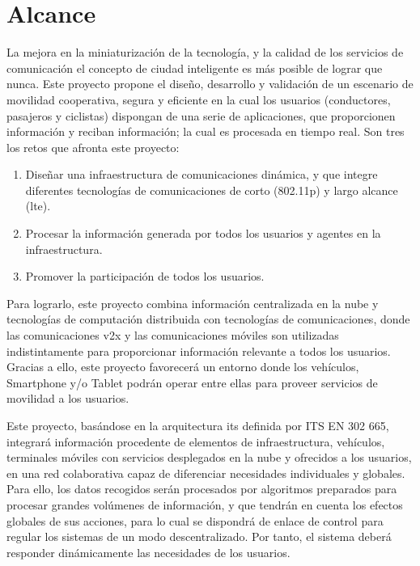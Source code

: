 \chapter{Alcance}\label{cha:alcance}
La mejora en la miniaturización de la tecnología, y la calidad de los servicios de comunicación el concepto de ciudad inteligente es más posible de lograr que nunca. Este proyecto propone el diseño, desarrollo y validación de un escenario de movilidad cooperativa, segura y eficiente en la cual los usuarios (conductores, pasajeros y ciclistas) dispongan de una serie de aplicaciones, que proporcionen información y reciban información; la cual es procesada en tiempo real. Son tres los retos que afronta este proyecto:

\begin{enumerate}
	\item Diseñar una infraestructura de comunicaciones dinámica, y que integre diferentes tecnologías de comunicaciones de corto (\gls{802.11p}) y largo alcance (\gls{lte}).
	\item Procesar la información generada por todos los usuarios y agentes en la infraestructura.
	\item Promover la participación de todos los usuarios.

\end{enumerate}
Para lograrlo, este proyecto combina información centralizada en la nube y tecnologías de computación distribuida con tecnologías de comunicaciones, donde las comunicaciones \gls{v2x} y las comunicaciones móviles son utilizadas indistintamente para proporcionar información relevante a todos los usuarios. Gracias a ello, este proyecto favorecerá un entorno donde los vehículos, Smartphone y/o Tablet podrán operar entre ellas para proveer servicios de movilidad a los usuarios.

Este proyecto, basándose en la arquitectura \gls{its} definida por ITS EN 302 665, integrará información procedente de elementos de infraestructura, vehículos, terminales móviles con servicios desplegados en la nube y ofrecidos a los usuarios, en una red colaborativa capaz de diferenciar necesidades individuales y globales. Para ello, los datos recogidos serán procesados por algoritmos preparados para procesar grandes volúmenes de información, y que tendrán en cuenta los efectos globales de sus acciones, para lo cual se dispondrá de enlace de control para regular los sistemas de un modo descentralizado. Por tanto, el sistema deberá responder dinámicamente las necesidades de los usuarios.

